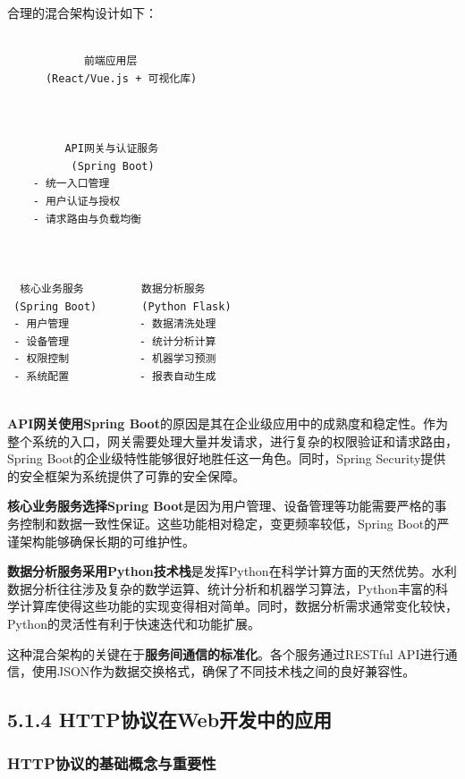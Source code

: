 合理的混合架构设计如下：

\begin{verbatim}

            前端应用层                    
      (React/Vue.js + 可视化库)           

                    

         API网关与认证服务                
          (Spring Boot)                  
    - 统一入口管理                        
    - 用户认证与授权                      
    - 请求路由与负载均衡                   

                              
   
  核心业务服务         数据分析服务    
 (Spring Boot)       (Python Flask)  
 - 用户管理           - 数据清洗处理   
 - 设备管理           - 统计分析计算   
 - 权限控制           - 机器学习预测   
 - 系统配置           - 报表自动生成   
   
\end{verbatim}

\textbf{API网关使用Spring Boot}的原因是其在企业级应用中的成熟度和稳定性。作为整个系统的入口，网关需要处理大量并发请求，进行复杂的权限验证和请求路由，Spring Boot的企业级特性能够很好地胜任这一角色。同时，Spring Security提供的安全框架为系统提供了可靠的安全保障。

\textbf{核心业务服务选择Spring Boot}是因为用户管理、设备管理等功能需要严格的事务控制和数据一致性保证。这些功能相对稳定，变更频率较低，Spring Boot的严谨架构能够确保长期的可维护性。

\textbf{数据分析服务采用Python技术栈}是发挥Python在科学计算方面的天然优势。水利数据分析往往涉及复杂的数学运算、统计分析和机器学习算法，Python丰富的科学计算库使得这些功能的实现变得相对简单。同时，数据分析需求通常变化较快，Python的灵活性有利于快速迭代和功能扩展。

这种混合架构的关键在于\textbf{服务间通信的标准化}。各个服务通过RESTful API进行通信，使用JSON作为数据交换格式，确保了不同技术栈之间的良好兼容性。

\subsection{5.1.4 HTTP协议在Web开发中的应用}\label{httpux534fux8baeux5728webux5f00ux53d1ux4e2dux7684ux5e94ux7528}

\subsubsection{HTTP协议的基础概念与重要性}\label{httpux534fux8baeux7684ux57faux7840ux6982ux5ff5ux4e0eux91cdux8981ux6027}


